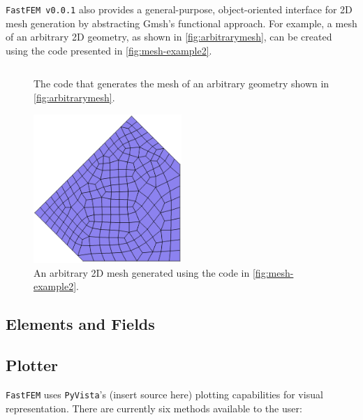 \documentclass[headings=standardclasses, abstract=true]{scrartcl}
\newcommand{\pythonCodeBlock}[3]{%
    \begin{figure}
        \centering
        \begin{pythonbox}
            \inputminted[fontfamily=VSCode, fontsize=\scriptsize]{python}{#1}
        \end{pythonbox}
        \caption{#2}
        \label{#3}
    \end{figure}
}
\begin{document}
\texttt{FastFEM v0.0.1} also provides a general-purpose, object-oriented interface for 2D mesh generation by abstracting Gmsh's functional approach. For example, a mesh of an arbitrary 2D geometry, as shown in \autoref{fig:arbitrarymesh}, can be created using the code presented in \autoref{fig:mesh-example2}.

\pythonCodeBlock{figures/mesher-example2.py}{The code that generates the mesh of an arbitrary geometry shown in \autoref{fig:arbitrarymesh}.}{fig:mesh-example2}

\begin{figure}[H]
    \centering
    \includegraphics[width=0.5\textwidth]{figures/arbitrary_mesh.png}
    \caption{An arbitrary 2D mesh generated using the code in \autoref{fig:mesh-example2}.}
    \label{fig:arbitrarymesh}
\end{figure}

\subsection{Elements and Fields}

\subsection{Plotter}

\texttt{FastFEM} uses \texttt{PyVista}'s (insert source here) plotting capabilities for visual representation. There are currently six methods available to the user:
\end{document}
